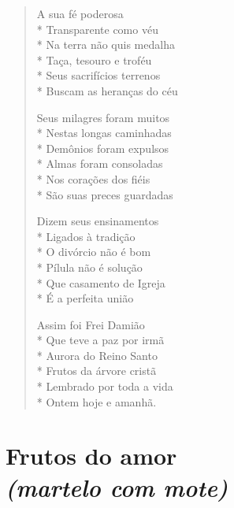 \begin{verse}
A sua fé poderosa\\*
Transparente como véu\\*
Na terra não quis medalha\\*
Taça, tesouro e troféu\\*
Seus sacrifícios terrenos\\*
Buscam as heranças do céu

Seus milagres foram muitos\\*
Nestas longas caminhadas\\*
Demônios foram expulsos\\*
Almas foram consoladas\\*
Nos corações dos fiéis\\*
São suas preces guardadas

Dizem seus ensinamentos\\*
Ligados à tradição\\*
O divórcio não é bom\\*
Pílula não é solução\\*
Que casamento de Igreja\\*
É a perfeita união

Assim foi Frei Damião\\*
Que teve a paz por irmã\\*
Aurora do Reino Santo\\*
Frutos da árvore cristã\\*
Lembrado por toda a vida\\*
Ontem hoje e amanhã.
\end{verse}


\chapter[Frutos do amor]{Frutos do amor\\\smallskip\textit{(martelo com mote)}}

